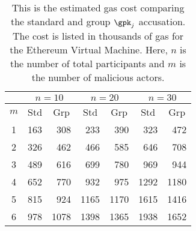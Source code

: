 \begin{table}
\centering
\begin{tabular}{|c||r|r||r|r||r|r|}
\hline
  & \multicolumn{2}{|c||}{$n = 10$} & \multicolumn{2}{|c||}{$n = 20$} &
    \multicolumn{2}{|c|}{$n = 30$} \\
\hline
    $m$ & \multicolumn{1}{|c|}{Std} & \multicolumn{1}{|c||}{Grp} &
          \multicolumn{1}{|c|}{Std} & \multicolumn{1}{|c||}{Grp} &
          \multicolumn{1}{|c|}{Std} & \multicolumn{1}{|c||}{Grp} \\
\hline
    1 & 163 &  308 &  233 &  390 &  323 &  472 \\
    2 & 326 &  462 &  466 &  585 &  646 &  708 \\
    3 & 489 &  616 &  699 &  780 &  969 &  944 \\
    4 & 652 &  770 &  932 &  975 & 1292 & 1180 \\
    5 & 815 &  924 & 1165 & 1170 & 1615 & 1416 \\
    6 & 978 & 1078 & 1398 & 1365 & 1938 & 1652 \\
\hline
\end{tabular}
\caption[Malicious $\gpk_{j}$ Accusation Gas Cost]{
This is the estimated gas cost comparing the standard and group
$\gpk_{j}$ accusation. The cost is listed in thousands of gas
for the Ethereum Virtual Machine.
Here, $n$ is the number of total participants and $m$ is the number
of malicious actors.
}
\label{tab:gpkj_gas_cost}
\end{table}
